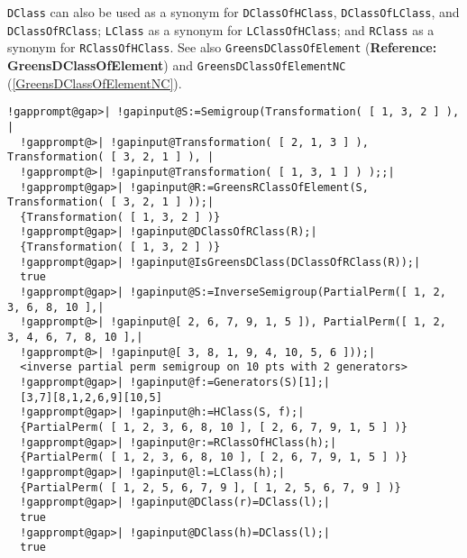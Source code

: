 \documentclass[a4paper,11pt]{report}
\begin{document}
{{{ \texttt{DClass} can also be used as a synonym for \texttt{DClassOfHClass}, \texttt{DClassOfLClass}, and \texttt{DClassOfRClass}; \texttt{LClass} as a synonym for \texttt{LClassOfHClass}; and \texttt{RClass} as a synonym for \texttt{RClassOfHClass}. See also \texttt{GreensDClassOfElement} (\textbf{Reference: GreensDClassOfElement}) and \texttt{GreensDClassOfElementNC} (\ref{GreensDClassOfElementNC}). 
\begin{Verbatim}[commandchars=!@|,fontsize=\small,frame=single,label=Example]
  !gapprompt@gap>| !gapinput@S:=Semigroup(Transformation( [ 1, 3, 2 ] ), |
  !gapprompt@>| !gapinput@Transformation( [ 2, 1, 3 ] ), Transformation( [ 3, 2, 1 ] ), |
  !gapprompt@>| !gapinput@Transformation( [ 1, 3, 1 ] ) );;|
  !gapprompt@gap>| !gapinput@R:=GreensRClassOfElement(S, Transformation( [ 3, 2, 1 ] ));|
  {Transformation( [ 1, 3, 2 ] )}
  !gapprompt@gap>| !gapinput@DClassOfRClass(R);|
  {Transformation( [ 1, 3, 2 ] )}
  !gapprompt@gap>| !gapinput@IsGreensDClass(DClassOfRClass(R));|
  true
  !gapprompt@gap>| !gapinput@S:=InverseSemigroup(PartialPerm([ 1, 2, 3, 6, 8, 10 ],|
  !gapprompt@>| !gapinput@[ 2, 6, 7, 9, 1, 5 ]), PartialPerm([ 1, 2, 3, 4, 6, 7, 8, 10 ],|
  !gapprompt@>| !gapinput@[ 3, 8, 1, 9, 4, 10, 5, 6 ]));|
  <inverse partial perm semigroup on 10 pts with 2 generators>
  !gapprompt@gap>| !gapinput@f:=Generators(S)[1];|
  [3,7][8,1,2,6,9][10,5]
  !gapprompt@gap>| !gapinput@h:=HClass(S, f);|
  {PartialPerm( [ 1, 2, 3, 6, 8, 10 ], [ 2, 6, 7, 9, 1, 5 ] )}
  !gapprompt@gap>| !gapinput@r:=RClassOfHClass(h);|
  {PartialPerm( [ 1, 2, 3, 6, 8, 10 ], [ 2, 6, 7, 9, 1, 5 ] )}
  !gapprompt@gap>| !gapinput@l:=LClass(h);|
  {PartialPerm( [ 1, 2, 5, 6, 7, 9 ], [ 1, 2, 5, 6, 7, 9 ] )}
  !gapprompt@gap>| !gapinput@DClass(r)=DClass(l);|
  true
  !gapprompt@gap>| !gapinput@DClass(h)=DClass(l);|
  true
\end{Verbatim}
 }

 
}}
\end{document}
